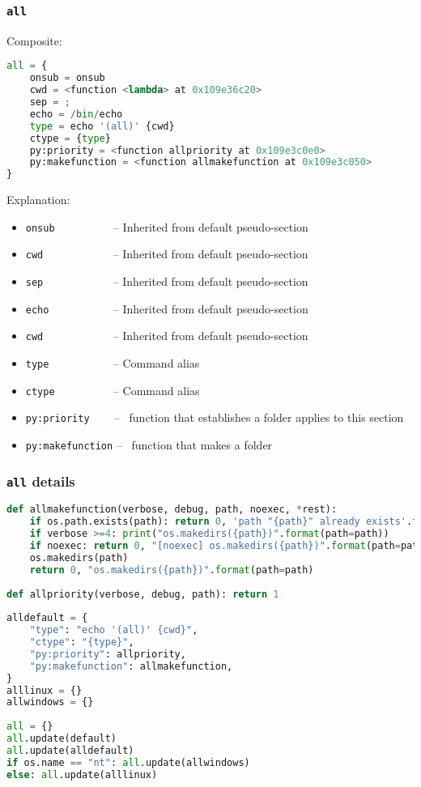 \subsubsection*{\lstinline{all} \Linux}

Composite:

\begin{snugshade}
\begin{lstlisting}[language=python]
all = {
	onsub = onsub
	cwd = <function <lambda> at 0x109e36c20>
	sep = ;
	echo = /bin/echo
	type = echo '(all)' {cwd}
	ctype = {type}
	py:priority = <function allpriority at 0x109e3c0e0>
	py:makefunction = <function allmakefunction at 0x109e3c050>
}
\end{lstlisting}
\end{snugshade}

Explanation:

\begin{itemize}
\item \lstinline{onsub} ~~~~~~~~~ -- Inherited from default pseudo-section
\item \lstinline{cwd} ~~~~~~~~~~~ -- Inherited from default pseudo-section
\item \lstinline{sep} ~~~~~~~~~~~ -- Inherited from default pseudo-section
\item \lstinline{echo} ~~~~~~~~~~ -- Inherited from default pseudo-section
\item \lstinline{cwd} ~~~~~~~~~~~ -- Inherited from default pseudo-section
\item \lstinline{type} ~~~~~~~~~~ -- Command alias
\item \lstinline{ctype} ~~~~~~~~~ -- Command alias
\item \lstinline{py:priority} ~~~ -- \Python\ function that establishes a folder applies to this section
\item \lstinline{py:makefunction} -- \Python\ function that makes a folder
\end{itemize}

\subsubsection*{\lstinline{all} details}

\begin{snugshade}
\begin{lstlisting}[language=python]
def allmakefunction(verbose, debug, path, noexec, *rest):
	if os.path.exists(path): return 0, 'path "{path}" already exists'.format(path=path)
	if verbose >=4: print("os.makedirs({path})".format(path=path))
	if noexec: return 0, "[noexec] os.makedirs({path})".format(path=path)
	os.makedirs(path)
	return 0, "os.makedirs({path})".format(path=path)
	
def allpriority(verbose, debug, path): return 1
	
alldefault = {
	"type": "echo '(all)' {cwd}",
	"ctype": "{type}",
	"py:priority": allpriority,
	"py:makefunction": allmakefunction,
}
alllinux = {}
allwindows = {}
	
all = {}
all.update(default)
all.update(alldefault)
if os.name == "nt": all.update(allwindows)
else: all.update(alllinux)
\end{lstlisting}
\end{snugshade}

